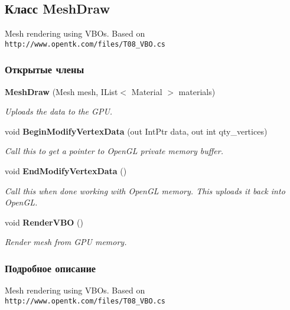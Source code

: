 \subsection{Класс Mesh\+Draw}
\label{class_win_form_animation2_d_1_1_mesh_draw}


Mesh rendering using V\+B\+Os. Based on {\tt http\+://www.\+opentk.\+com/files/\+T08\+\_\+\+V\+B\+O.\+cs}  


\subsubsection*{Открытые члены}
\begin{DoxyCompactItemize}
\item 
{\bf Mesh\+Draw} (Mesh mesh, I\+List$<$ Material $>$ materials)
\begin{DoxyCompactList}\small\item\em Uploads the data to the G\+PU. \end{DoxyCompactList}\item 
void {\bf Begin\+Modify\+Vertex\+Data} (out Int\+Ptr data, out int qty\+\_\+vertices)\label{class_win_form_animation2_d_1_1_mesh_draw_aa0c07f4d1ee0f383a56b62bc2685014b}

\begin{DoxyCompactList}\small\item\em Call this to get a pointer to Open\+GL private memory buffer. \end{DoxyCompactList}\item 
void {\bf End\+Modify\+Vertex\+Data} ()\label{class_win_form_animation2_d_1_1_mesh_draw_a79c6f246eeb35bf63a33e850ad9038f0}

\begin{DoxyCompactList}\small\item\em Call this when done working with Open\+GL memory. This uploads it back into Open\+GL. \end{DoxyCompactList}\item 
void {\bf Render\+V\+BO} ()
\begin{DoxyCompactList}\small\item\em Render mesh from G\+PU memory. \end{DoxyCompactList}\end{DoxyCompactItemize}


\subsubsection{Подробное описание}
Mesh rendering using V\+B\+Os. Based on {\tt http\+://www.\+opentk.\+com/files/\+T08\+\_\+\+V\+B\+O.\+cs} 



